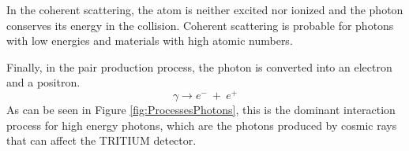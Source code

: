 In the coherent scattering, the atom is neither excited nor ionized and the photon conserves its energy in the collision. Coherent scattering is probable for photons with low energies and materials with high atomic numbers. %

Finally, in the pair production process, the photon is converted into an electron and a positron. 
\begin{equation}
\gamma \longrightarrow e^- ~ + ~ e^+
\label{eq:pairproductionprocess}
\end{equation}
As can be seen in Figure \ref{fig:ProcessesPhotons}, this is the dominant interaction process for high energy photons, which are the photons produced by cosmic rays that can affect the TRITIUM detector.


